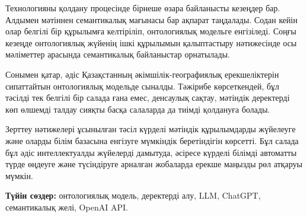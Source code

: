 Технологияны қолдану процесінде бірнеше өзара байланысты кезеңдер бар.
Алдымен мәтіннен семантикалық мағынасы бар ақпарат таңдалады. Содан
кейін олар белгілі бір құрылымға келтіріліп, онтологиялық модельге
енгізіледі. Соңғы кезеңде онтологиялық жүйенің ішкі құрылымын
қалыптастыру нәтижесінде осы мәліметтер арасында семантикалық
байланыстар орнатылады.

Сонымен қатар, әдіс Қазақстанның әкімшілік-географиялық ерекшеліктерін
сипаттайтын онтологиялық модельде сыналды. Тәжірибе көрсеткендей, бұл
тәсілді тек белгілі бір салада ғана емес, денсаулық сақтау, мәтіндік
деректерді көп өлшемді талдау сияқты басқа салаларда да тиімді қолдануға
болады.

Зерттеу нәтижелері ұсынылған тәсіл күрделі мәтіндік құрылымдарды
жүйелеуге және оларды білім базасына енгізуге мүмкіндік беретіндігін
көрсетті. Бұл салада бұл әдіс интеллектуалды жүйелерді дамытуда, әсіресе
күрделі білімді автоматты түрде өңдеуге және түсіндіруге арналған
жобаларда ерекше маңызды рөл атқаруы мүмкін.

{\bfseries Түйін сөздер:} онтологиялық модель, деректерді алу, LLM,
ChatGPT, семантикалық желі, OpenAI API.


